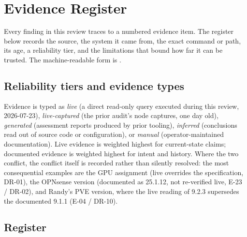 \section{Evidence Register}\label{sec:evidence}

Every finding in this review traces to a numbered evidence item. The register below
records the source, the system it came from, the exact command or path, its age, a
reliability tier, and the limitations that bound how far it can be trusted. The
machine-readable form is .

\subsection{Reliability tiers and evidence types}

Evidence is typed as \emph{live} (a direct read-only query executed during this
review, 2026-07-23), \emph{live-captured} (the prior audit's node captures, one day
old), \emph{generated} (assessment reports produced by prior tooling),
\emph{inferred} (conclusions read out of source code or configuration), or
\emph{manual} (operator-maintained documentation). Live evidence is weighted
highest for current-state claims; documented evidence is weighted highest for
intent and history. Where the two conflict, the conflict itself is recorded rather
than silently resolved: the most consequential examples are the GPU assignment
(live overrides the specification, DR-01), the OPNsense version (documented as
25.1.12, not re-verified live, E-23 / DR-02), and Randy's PVE version, where the
live reading of 9.2.3 supersedes the documented 9.1.1 (E-04 / DR-10).

\subsection{Register}

